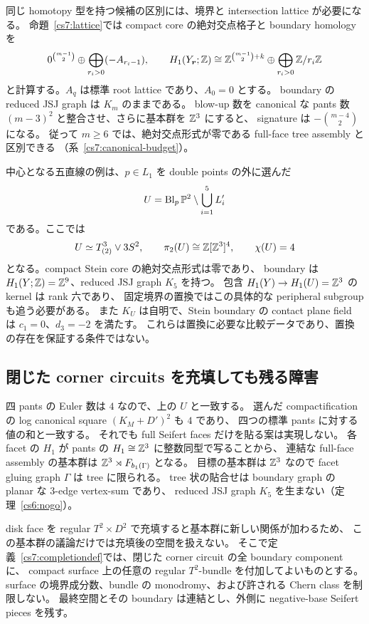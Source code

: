 同じ homotopy 型を持つ候補の区別には、境界と intersection lattice が必要になる。
命題~\ref{cs7:lattice}では compact core の絶対交点格子と boundary homology を
\[
 0^{\binom{m-1}{2}}\oplus\bigoplus_{r_i>0}(-A_{r_i-1}),
 \qquad
 H_1(Y_{\boldsymbol r};\mathbb Z)
 \cong\mathbb Z^{\binom{m-1}{2}+k}
       \oplus\bigoplus_{r_i>0}\mathbb Z/r_i\mathbb Z
\]
と計算する。$A_q$ は標準 root lattice であり、$A_0=0$ とする。
boundary の reduced JSJ graph は $K_m$ のままである。
blow-up 数を canonical な pants 数 $(m-3)^2$ と整合させ、さらに基本群を $\mathbb Z^3$ にすると、
signature は $-\binom{m-4}{2}$ になる。
従って $m\geq6$ では、絶対交点形式が零である full-face tree assembly と区別できる
（系~\ref{cs7:canonical-budget}）。

中心となる五直線の例は、$p\in L_1$ を double points の外に選んだ
\[
 U=\operatorname{Bl}_p\mathbb P^2\setminus\bigcup_{i=1}^5L_i'
\]
である。ここでは
\[
 U\simeq T^3_{(2)}\vee3S^2,
 \qquad \pi_2(U)\cong\mathbb Z[\mathbb Z^3]^4,
 \qquad \chi(U)=4
\]
となる。compact Stein core の絶対交点形式は零であり、
boundary は $H_1(Y;\mathbb Z)=\mathbb Z^9$、reduced JSJ graph $K_5$ を持つ。
包含 $H_1(Y)\to H_1(U)=\mathbb Z^3$ の kernel は rank 六であり、
固定境界の置換ではこの具体的な peripheral subgroup も追う必要がある。
また $K_U$ は自明で、Stein boundary の contact plane field は
$c_1=0$、$d_3=-2$ を満たす。
これらは置換に必要な比較データであり、置換の存在を保証する条件ではない。

\subsection{閉じた corner circuits を充填しても残る障害}

四 pants の Euler 数は $4$ なので、上の $U$ と一致する。
選んだ compactification の log canonical square $(K_M+D')^2$ も $4$ であり、
四つの標準 pants に対する値の和と一致する。
それでも full Seifert faces だけを貼る案は実現しない。
各 facet の $H_1$ が pants の $H_1\cong\mathbb Z^3$ に整数同型で写ることから、
連結な full-face assembly の基本群は
$\mathbb Z^3\rtimes F_{b_1(\Gamma)}$ となる。
目標の基本群は $\mathbb Z^3$ なので facet gluing graph $\Gamma$ は tree に限られる。
tree 状の貼合せは boundary graph の planar な $3$-edge vertex-sum であり、
reduced JSJ graph $K_5$ を生まない（定理~\ref{cs6:nogo}）。

disk face を regular $T^2\times D^2$ で充填すると基本群に新しい関係が加わるため、
この基本群の議論だけでは充填後の空間を扱えない。
そこで定義~\ref{cs7:completiondef}では、閉じた corner circuit の全 boundary component に、
compact surface 上の任意の regular $T^2$-bundle を付加してよいものとする。
surface の境界成分数、bundle の monodromy、および許される Chern class を制限しない。
最終空間とその boundary は連結とし、外側に negative-base Seifert pieces を残す。

